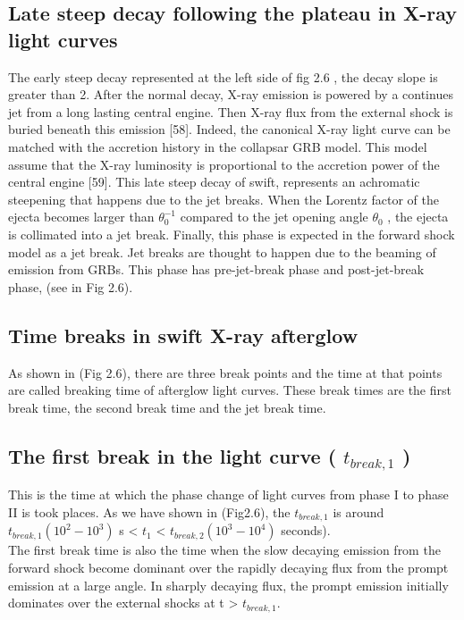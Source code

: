 \subsection{Late steep decay following the plateau in X-ray light curves}
 The early steep decay represented at the left side of fig 2.6 , the decay slope is greater than 2. After the normal decay, X-ray emission is powered by a continues jet from a long lasting central engine. Then X-ray flux from the external shock is buried beneath this emission [58]. Indeed, the canonical X-ray light curve can be matched with the accretion history in the collapsar GRB model. This model assume that the X-ray luminosity is proportional to the accretion power of the central engine [59].
This late steep decay of swift, represents an achromatic steepening that happens
due to the jet breaks. When the Lorentz factor of the ejecta becomes larger than
$ \theta_{0}^{-1} $ compared to the jet opening angle $ \theta_{0} $ , the ejecta is collimated into a jet break. Finally, this phase is expected in the forward shock model as a jet break. Jet breaks are thought to happen due to the beaming of  emission from GRBs. This phase has pre-jet-break phase and post-jet-break phase, (see in Fig 2.6).\citep{44} \citep{45}
\subsection{Time breaks in swift X-ray afterglow}
As shown in (Fig 2.6), there are three break points and the time at that points are called breaking time of afterglow light curves. These break times are the first break time, the second break time and the jet break time.\\
\subsection{The first break in the light curve ( $ t_{break,1} $ )}
This is the time at which the phase change of light curves from phase I to phase II is took places. As we have shown in (Fig2.6), the $ t_{break,1} $ is around  $t_{break,1} (10^{2} - 10^{3} ) $ s  < $ t_{1} $ <  $ t_{break,2}( 10^{3} - 10^{4})$ seconds).\\
The first break time is also the time when the slow decaying emission from the
forward shock become dominant over the rapidly decaying flux from the prompt
emission at a large angle. In sharply decaying flux, the prompt emission initially
dominates over the external shocks at t > $ t_{break,1} $\citep{46}.
